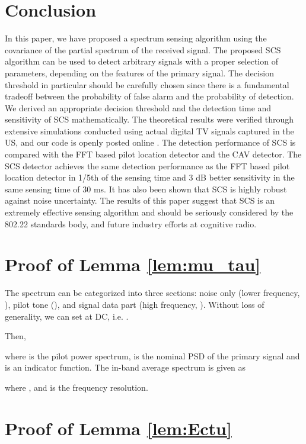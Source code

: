 \documentclass[draftclsnofoot,onecolumn,12pt]{IEEEtran}
\begin{document}
\section{Conclusion}
\label{sec:conclusion}


In this paper, we have proposed a spectrum sensing algorithm using the covariance of the partial spectrum of the received signal.
The proposed SCS algorithm can be used to
detect arbitrary signals with a proper selection of parameters, depending on the features of the primary signal.
The decision threshold in particular should be carefully chosen since there is a fundamental tradeoff between the probability of false alarm and the probability of detection.
We derived an appropriate decision threshold and the detection time and sensitivity of SCS mathematically.
The theoretical results were verified through extensive simulations
conducted using actual digital TV signals captured in the US, and our code is openly posted online \cite{SCS-CODE-URL}.
The detection performance of SCS is compared with the FFT based pilot location detector and
the CAV detector. The SCS detector achieves the same detection performance as the FFT based pilot location detector in 1/5th of the sensing time
and 3 dB better sensitivity in the same sensing time of 30 ms. It has also been shown that SCS is highly robust
against noise uncertainty. 
The results of this paper suggest that SCS is an extremely effective sensing algorithm
and should be seriously considered by the 802.22 standards body, and future industry efforts at cognitive radio. 


\appendices
\section{Proof of Lemma \ref{lem:mu_tau}}
\label{apdx:proof_mu_tau}

The spectrum can be categorized into three sections: noise only (lower frequency, ), pilot tone (), and signal data part (high frequency, ).
Without loss of generality, we can set
 at DC, i.e. .

Then,

where  is the pilot power spectrum,  is the nominal PSD of the primary signal and  is an indicator function.  The in-band average spectrum is given as

where
, 
and  is the frequency resolution.

\section{Proof of Lemma \ref{lem:Ectu}}
\label{apdx:proof_Ectu}
\end{document}
